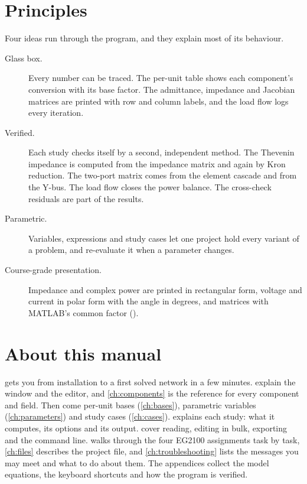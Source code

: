 \section{Principles}

Four ideas run through the program, and they explain most of its behaviour.

\begin{description}
  \item[Glass box.] Every number can be traced. The per-unit table shows each component's
    conversion with its base factor. The admittance, impedance and Jacobian matrices are
    printed with row and column labels, and the load flow logs every iteration.
  \item[Verified.] Each study checks itself by a second, independent method. The Thevenin
    impedance is computed from the impedance matrix and again by Kron reduction. The
    two-port matrix comes from the element cascade and from the Y-bus. The load flow
    closes the power balance. The cross-check residuals are part of the results.
  \item[Parametric.] Variables, expressions and study cases let one project hold every
    variant of a problem, and re-evaluate it when a parameter changes.
  \item[Course-grade presentation.] Impedance and complex power are printed in rectangular
    form, voltage and current in polar form with the angle in degrees, and matrices with
    MATLAB's common factor ().
\end{description}

\section{About this manual}

 gets you from installation to a first solved network in a few
minutes.  explain the window and the editor, and
\cref{ch:components} is the reference for every component and field. Then come per-unit
bases (\cref{ch:bases}), parametric variables (\cref{ch:parameters}) and study cases
(\cref{ch:cases}).  explains each study: what it computes, its options
and its output.  cover reading,
editing in bulk, exporting and the command line.  walks through the
four EG2100 assignments task by task, \cref{ch:files} describes the project file, and
\cref{ch:troubleshooting} lists the messages you may meet and what to do about them. The
appendices collect the model equations, the keyboard shortcuts and how the program is
verified.

